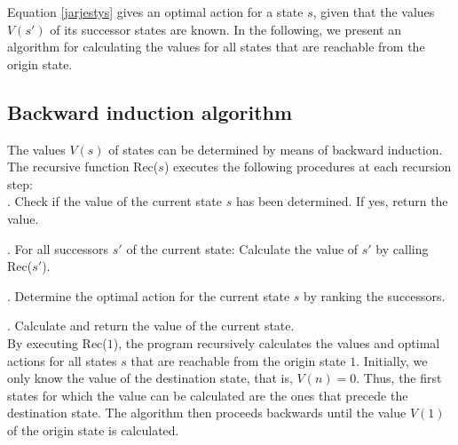 \documentclass[dissertation,draft*]{aaltoseries}
\begin{document}
Equation \eqref{jarjestys} 
gives an optimal action for a state $s$, given that the values $V(s')$ of its successor states are known.
In the following, we present an algorithm for calculating the values for all states that are reachable from the origin state.

\subsection{Backward induction algorithm}
\label{alg01}
The values $V(s)$ of states can be determined
by means of backward induction. The recursive function Rec($s$) executes the following procedures at each recursion step:
\\

. Check if the value of the current state $s$ has been determined. If yes, return the value.

. For all successors $s'$ of the current state: Calculate the value of $s'$ by calling Rec($s'$).

. Determine the optimal action for the current state $s$ by ranking the successors.

. Calculate and return the value of the current state.
\\

By executing Rec($1$), the program recursively calculates the values and optimal actions for 
all states $s$ that are reachable from the origin state $1$.
Initially, we only know the value of the destination state, that is, $V(n)=0$.
Thus, the first states for which the value can be calculated
are the ones that precede the destination state. 
The algorithm then proceeds backwards until the value $V(1)$ of the origin state is calculated.
\end{document}
